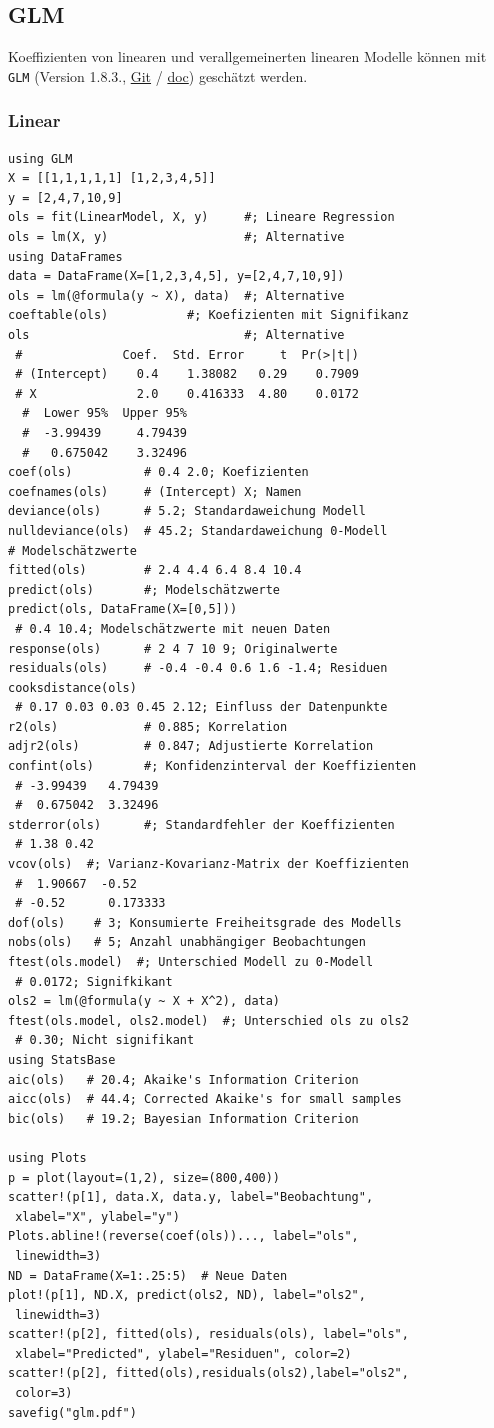 \documentclass[10pt,twocolumn]{scrartcl}
\begin{document}
\subsection{GLM}

Koeffizienten von linearen und verallgemeinerten linearen Modelle können mit
\lstinline|GLM| (Version 1.8.3.,
\href{https://github.com/JuliaStats/GLM.jl}{Git} /
\href{https://juliastats.org/GLM.jl/stable/}{doc}) geschätzt werden.

\subsubsection{Linear}

\begin{lstlisting}
using GLM
X = [[1,1,1,1,1] [1,2,3,4,5]]
y = [2,4,7,10,9]
ols = fit(LinearModel, X, y)     #; Lineare Regression
ols = lm(X, y)                   #; Alternative
using DataFrames
data = DataFrame(X=[1,2,3,4,5], y=[2,4,7,10,9])
ols = lm(@formula(y ~ X), data)  #; Alternative
coeftable(ols)           #; Koefizienten mit Signifikanz
ols                              #; Alternative
 #              Coef.  Std. Error     t  Pr(>|t|)
 # (Intercept)    0.4    1.38082   0.29    0.7909
 # X              2.0    0.416333  4.80    0.0172
  #  Lower 95%  Upper 95%
  #  -3.99439     4.79439
  #   0.675042    3.32496
coef(ols)          # 0.4 2.0; Koefizienten
coefnames(ols)     # (Intercept) X; Namen
deviance(ols)      # 5.2; Standardaweichung Modell
nulldeviance(ols)  # 45.2; Standardaweichung 0-Modell
# Modelschätzwerte
fitted(ols)        # 2.4 4.4 6.4 8.4 10.4
predict(ols)       #; Modelschätzwerte
predict(ols, DataFrame(X=[0,5]))
 # 0.4 10.4; Modelschätzwerte mit neuen Daten
response(ols)      # 2 4 7 10 9; Originalwerte
residuals(ols)     # -0.4 -0.4 0.6 1.6 -1.4; Residuen
cooksdistance(ols)
 # 0.17 0.03 0.03 0.45 2.12; Einfluss der Datenpunkte
r2(ols)            # 0.885; Korrelation
adjr2(ols)         # 0.847; Adjustierte Korrelation
confint(ols)       #; Konfidenzinterval der Koeffizienten
 # -3.99439   4.79439
 #  0.675042  3.32496
stderror(ols)      #; Standardfehler der Koeffizienten
 # 1.38 0.42
vcov(ols)  #; Varianz-Kovarianz-Matrix der Koeffizienten
 #  1.90667  -0.52
 # -0.52      0.173333
dof(ols)    # 3; Konsumierte Freiheitsgrade des Modells
nobs(ols)   # 5; Anzahl unabhängiger Beobachtungen
ftest(ols.model)  #; Unterschied Modell zu 0-Modell
 # 0.0172; Signifkikant
ols2 = lm(@formula(y ~ X + X^2), data)
ftest(ols.model, ols2.model)  #; Unterschied ols zu ols2
 # 0.30; Nicht signifikant
using StatsBase
aic(ols)   # 20.4; Akaike's Information Criterion
aicc(ols)  # 44.4; Corrected Akaike's for small samples
bic(ols)   # 19.2; Bayesian Information Criterion

using Plots
p = plot(layout=(1,2), size=(800,400))
scatter!(p[1], data.X, data.y, label="Beobachtung",
 xlabel="X", ylabel="y")
Plots.abline!(reverse(coef(ols))..., label="ols",
 linewidth=3)
ND = DataFrame(X=1:.25:5)  # Neue Daten
plot!(p[1], ND.X, predict(ols2, ND), label="ols2",
 linewidth=3)
scatter!(p[2], fitted(ols), residuals(ols), label="ols",
 xlabel="Predicted", ylabel="Residuen", color=2)
scatter!(p[2], fitted(ols),residuals(ols2),label="ols2",
 color=3)
savefig("glm.pdf")
\end{lstlisting}
\end{document}
